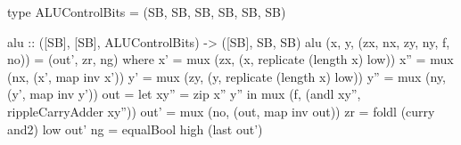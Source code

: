 \begin{haskellcode}
    type ALUControlBits = (SB, SB, SB, SB, SB, SB)

    alu :: ([SB], [SB], ALUControlBits) -> ([SB], SB, SB)
    alu (x, y, (zx, nx, zy, ny, f, no)) = (out', zr, ng)
        where
            x'   = mux (zx, (x, replicate (length x) low))
            x''  = mux (nx, (x', map inv x'))
            y'   = mux (zy, (y, replicate (length x) low))
            y''  = mux (ny, (y', map inv y'))
            out  = let xy'' = zip x'' y'' in mux (f, (andl xy'', rippleCarryAdder xy''))
            out' = mux (no, (out, map inv out))
            zr   = foldl (curry and2) low out'
            ng   = equalBool high (last out')
\end{haskellcode}
